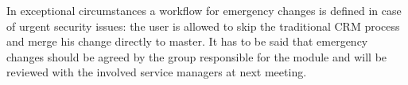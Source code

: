 In exceptional circumstances a workflow for emergency changes is defined in
case of urgent security issues: the user is allowed to skip the traditional CRM
process and merge his change directly to master. It has to be said that
emergency changes should be agreed by the group responsible for the module and
will be reviewed with the involved service managers at next meeting.

